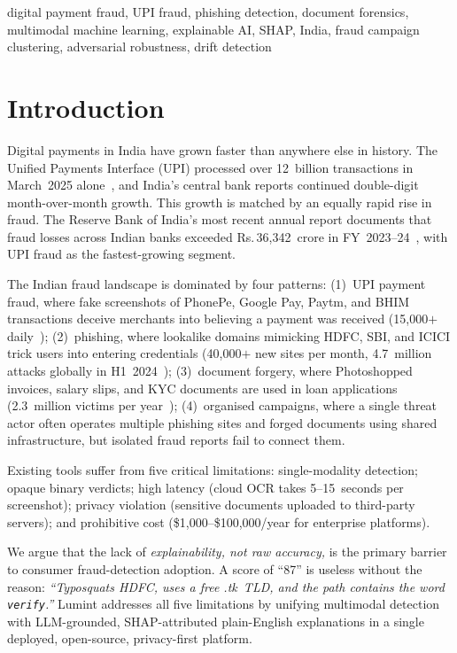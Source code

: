 \documentclass[conference]{IEEEtran}
\def\rupee{\textrm{Rs.\,}}
\begin{document}
\begin{IEEEkeywords}
digital payment fraud, UPI fraud, phishing detection, document
forensics, multimodal machine learning, explainable AI, SHAP, India,
fraud campaign clustering, adversarial robustness, drift detection
\end{IEEEkeywords}

\section{Introduction}

Digital payments in India have grown faster than anywhere else in
history. The Unified Payments Interface (UPI) processed over
12~billion transactions in March~2025 alone~\cite{npci2025}, and
India's central bank reports continued double-digit month-over-month
growth. This growth is matched by an equally rapid rise in fraud.
The Reserve Bank of India's most recent annual report documents that
fraud losses across Indian banks exceeded \rupee{}36{,}342~crore in
FY~2023--24~\cite{rbi2024}, with UPI fraud as the fastest-growing
segment.

The Indian fraud landscape is dominated by four patterns: (1)~UPI
payment fraud, where fake screenshots of PhonePe, Google Pay, Paytm,
and BHIM transactions deceive merchants into believing a payment was
received (15{,}000$+$ daily~\cite{certin2024}); (2)~phishing, where
lookalike domains mimicking HDFC, SBI, and ICICI trick users into
entering credentials (40{,}000$+$ new sites per month, 4.7~million
attacks globally in H1~2024~\cite{apwg2024}); (3)~document forgery,
where Photoshopped invoices, salary slips, and KYC documents are used
in loan applications (2.3~million victims per
year~\cite{rbi2023framework}); (4)~organised campaigns, where a single
threat actor often operates multiple phishing sites and forged
documents using shared infrastructure, but isolated fraud reports fail
to connect them.

Existing tools suffer from five critical limitations: single-modality
detection; opaque binary verdicts; high latency (cloud OCR takes
5--15~seconds per screenshot); privacy violation (sensitive documents
uploaded to third-party servers); and prohibitive cost
(\$1{,}000--\$100{,}000/year for enterprise platforms).

\vspace{3mm}

We argue that the lack of \textit{explainability, not raw accuracy,} is
the primary barrier to consumer fraud-detection adoption. A score of
``87'' is useless without the reason: \textit{``Typosquats HDFC, uses a
free .tk~TLD, and the path contains the word \texttt{verify}.''} Lumint
addresses all five limitations by unifying multimodal detection with
LLM-grounded, SHAP-attributed plain-English explanations in a single
deployed, open-source, privacy-first platform.
\end{document}
